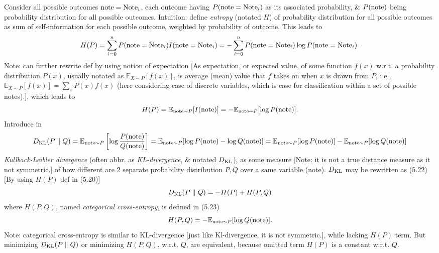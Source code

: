 \documentclass{article}
\begin{document}
\begin{itemize}
\begin{itemize}
\begin{itemize}
			Consider all possible outcomes ${\rm note} = {\rm Note}_i$, each outcome having $P({\rm note} = {\rm Note}_i)$ as its associated probability, \& $P({\rm note})$ being probability distribution for all possible outcomes. Intuition: define {\it entropy} (notated $H$) of probability distribution for all possible outcomes as sum of self-information for each possible outcome, weighted by probability of outcome. This leads to
			\begin{equation*}
				H(P) = \sum_{i=0}^n P({\rm note} = {\rm Note}_i)I({\rm note} = {\rm Note}_i) = -\sum_{i=0}^n P({\rm note} = {\rm Note}_i)\log P({\rm note} = {\rm Note}_i).
			\end{equation*}
			Note: can further rewrite def by using notion of expectation [As expectation, or expected value, of some function $f(x)$ w.r.t. a probability distribution $P(x)$, usually notated as $\mathbb{E}_{X\sim P}[f(x)]$, is average (mean) value that $f$ takes on when $x$ is drawn from $P$, i.e., $\mathbb{E}_{X\sim P}[f(x)] = \sum_x P(x)f(x)$ (here considering case of discrete variables, which is case for classification within a set of possible notes).], which leads to
			\begin{equation*}
				H(P) = \mathbb{E}_{{\rm note}\sim P}[I({\rm note})] = -\mathbb{E}_{{\rm note}\sim P}[\log P({\rm note})].
			\end{equation*}
			Introduce in
			\begin{equation*}
				D_{\rm KL}(P\parallel Q) = \mathbb{E}_{{\rm note}\sim P}\left[\log\frac{P({\rm note})}{Q({\rm note})}\right] = \mathbb{E}_{{\rm note}\sim P}[\log P({\rm note}) - \log Q({\rm note})] = \mathbb{E}_{{\rm note}\sim P}[\log P({\rm note})] - \mathbb{E}_{{\rm note}\sim P}[\log Q({\rm note})]
			\end{equation*}
			{\it Kullback-Leibler divergence} (often abbr. as {\it KL-divergence}, \& notated $D_{\rm KL}$), as some measure [Note: it is not a true distance measure as it not symmetric.] of how different are 2 separate probability distribution $P,Q$ over a same variable (note). $D_{\rm KL}$ may be rewritten as (5.22) [By using $H(P)$ def in (5.20)]
			\begin{equation*}
				D_{\rm KL}(P\parallel Q) = -H(P) + H(P,Q)
			\end{equation*}
			where $H(P,Q)$, named {\it categorical cross-entropy}, is defined in (5.23)
			\begin{equation*}
				H(P,Q) = -\mathbb{E}_{{\rm note}\sim P}[\log Q({\rm note})].
			\end{equation*}
			Note: categorical cross-entropy is similar to KL-divergence [just like Kl-divergence, it is not symmetric.], while lacking $H(P)$ term. But minimizing $D_{\rm KL}(P\parallel Q)$ or minimizing $H(P,Q)$, w.r.t. $Q$, are equivalent, because omitted term $H(P)$ is a constant w.r.t. $Q$.


\end{itemize}
\end{itemize}
\end{itemize}
\end{document}
